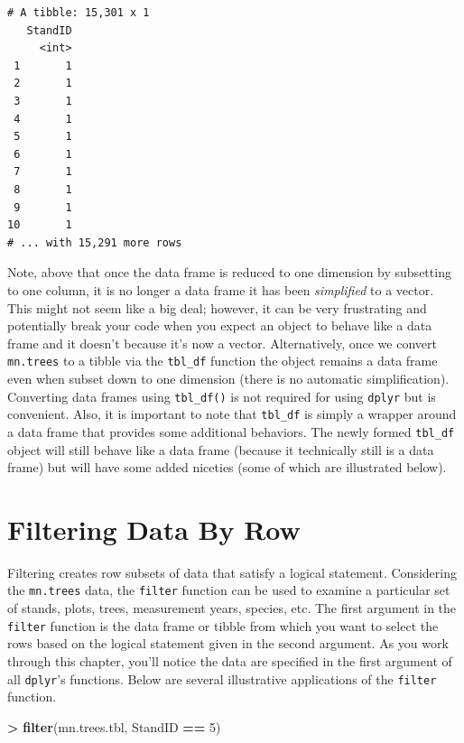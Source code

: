 \documentclass[]{krantz}
\makeatletter
\newenvironment{Shaded}{\begin{snugshade}}{\end{snugshade}}
\newcommand{\KeywordTok}[1]{\textcolor[rgb]{0.27,0.27,0.27}{\textbf{#1}}}
\newcommand{\DecValTok}[1]{\textcolor[rgb]{0.06,0.06,0.06}{#1}}
\newcommand{\StringTok}[1]{\textcolor[rgb]{0.5,0.5,0.5}{#1}}
\newcommand{\OperatorTok}[1]{\textcolor[rgb]{0.43,0.43,0.43}{\textbf{#1}}}
\newcommand{\NormalTok}[1]{#1}
\newenvironment{kframe}{%
\medskip{}
\setlength{\fboxsep}{.8em}
 \def\at@end@of@kframe{}%
 \ifinner\ifhmode%
  \def\at@end@of@kframe{\end{minipage}}%
  \begin{minipage}{\columnwidth}%
 \fi\fi%
 \def\FrameCommand##1{\hskip\@totalleftmargin \hskip-\fboxsep
 \colorbox{shadecolor}{##1}\hskip-\fboxsep
     \hskip-\linewidth \hskip-\@totalleftmargin \hskip\columnwidth}%
 \MakeFramed {\advance\hsize-\width
   \@totalleftmargin\z@ \linewidth\hsize
   \@setminipage}}%
 {\par\unskip\endMakeFramed%
 \at@end@of@kframe}
\renewenvironment{Shaded}{\begin{kframe}}{\end{kframe}}
\theoremstyle{definition}
\theoremstyle{definition}
\theoremstyle{definition}
\theoremstyle{remark}
\makeatother
\begin{document}
\begin{verbatim}
# A tibble: 15,301 x 1
   StandID
     <int>
 1       1
 2       1
 3       1
 4       1
 5       1
 6       1
 7       1
 8       1
 9       1
10       1
# ... with 15,291 more rows
\end{verbatim}

Note, above that once the data frame is reduced to one dimension by
subsetting to one column, it is no longer a data frame it has been
\emph{simplified} to a vector. This might not seem like a big deal;
however, it can be very frustrating and potentially break your code when
you expect an object to behave like a data frame and it doesn't because
it's now a vector. Alternatively, once we convert \texttt{mn.trees} to a
tibble via the \texttt{tbl\_df} function the object remains a data frame
even when subset down to one dimension (there is no automatic
simplification). Converting data frames using \texttt{tbl\_df()} is not
required for using \texttt{dplyr} but is convenient. Also, it is
important to note that \texttt{tbl\_df} is simply a wrapper around a
data frame that provides some additional behaviors. The newly formed
\texttt{tbl\_df} object will still behave like a data frame (because it
technically still is a data frame) but will have some added niceties
(some of which are illustrated below).

\section{Filtering Data By Row}\label{filtering-data-by-row}

Filtering creates row subsets of data that satisfy a logical statement.
Considering the \texttt{mn.trees} data, the \texttt{filter} function can
be used to examine a particular set of stands, plots, trees, measurement
years, species, etc. The first argument in the \texttt{filter} function
is the data frame or tibble from which you want to select the rows based
on the logical statement given in the second argument. As you work
through this chapter, you'll notice the data are specified in the first
argument of all \texttt{dplyr}'s functions. Below are several
illustrative applications of the \texttt{filter} function.

\begin{Shaded}
\begin{Highlighting}[]
\OperatorTok{>}\StringTok{ }\KeywordTok{filter}\NormalTok{(mn.trees.tbl, StandID }\OperatorTok{==}\StringTok{ }\DecValTok{5}\NormalTok{)}
\end{Highlighting}
\end{Shaded}
\end{document}
